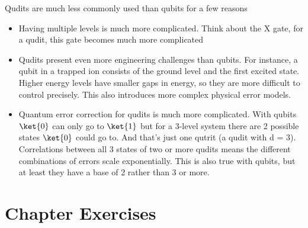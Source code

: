\documentclass{book}
\begin{document}
Qudits are much less commonly used than qubits for a few reasons
\begin{itemize}
\item Having multiple levels is much more complicated. Think about the X gate, for a qudit, this gate becomes much more complicated

\item Qudits present even more engineering challenges than qubits. For instance, a qubit in a trapped ion consists of the ground level and the first excited state. Higher energy levels have smaller gaps in energy, so they are more difficult to control precisely. This also introduces more complex physical error models. 

\item Quantum error correction for qudits is much more complicated. With qubits $\ket{0}$ can only go to $\ket{1}$ but for a 3-level system there are 2 possible states $\ket{0}$ could go to. And that's just one qutrit (a qudit with d = 3). Correlations between all 3 states of two or more qudits means the different combinations of errors scale exponentially. This is also true with qubits, but at least they have a base of 2 rather than 3 or more.
\end{itemize}

\section{Chapter Exercises}
\end{document}
